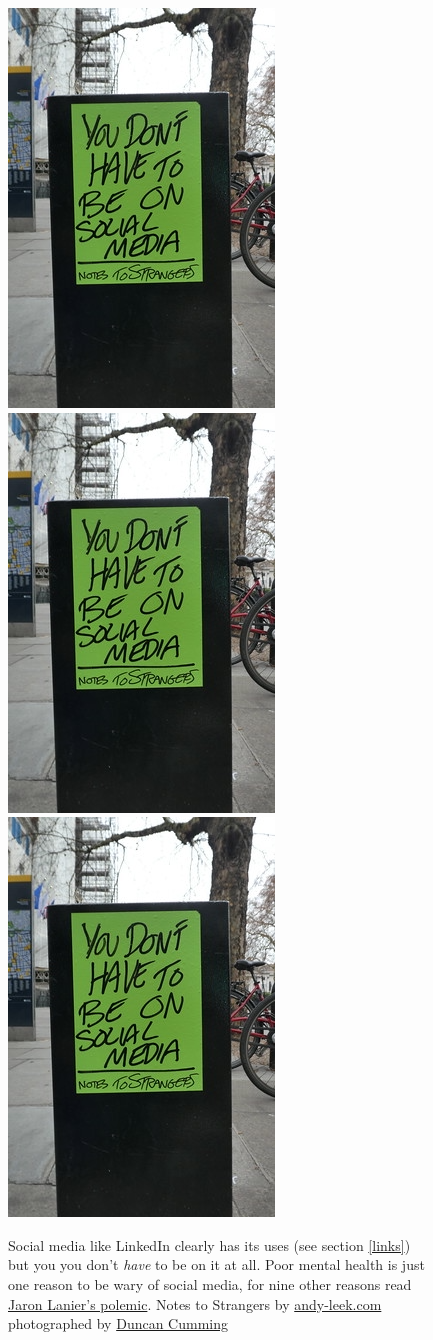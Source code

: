\documentclass[
]{book}
\begin{document}
\begin{figure}
\includegraphics[width=0.32\linewidth]{images/you-dont-have-to-be-on-social-media} \includegraphics[width=0.32\linewidth]{images/you-dont-have-to-be-on-social-media} \includegraphics[width=0.32\linewidth]{images/you-dont-have-to-be-on-social-media} \caption{Social media like LinkedIn clearly has its uses (see section \ref{links}) but you you don't \emph{have} to be on it at all. Poor mental health is just one reason to be wary of social media, for nine other reasons read \href{http://www.jaronlanier.com/tenarguments.html}{Jaron Lanier's polemic}. \citep{lanier} Notes to Strangers by \href{http://www.andy-leek.com/}{andy-leek.com} photographed by \href{https://www.flickr.com/photos/duncan/51014540593}{Duncan Cumming}}\label{fig:socialmedia-fig}
\end{figure}
\end{document}
